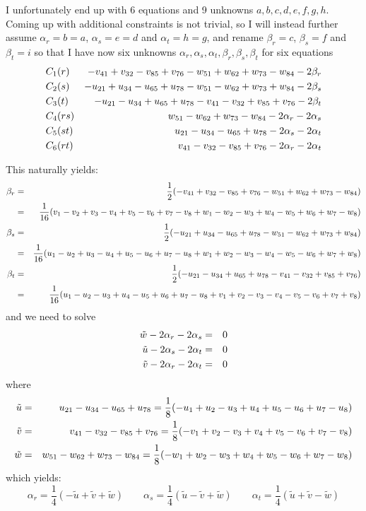 I unfortunately end up with 6 equations and 9 unknowns $a,b,c,d,e,f,g,h$.
Coming up with additional constraints is not trivial, so I will instead further assume 
$\alpha_r=b=a$, $\alpha_s=e=d$ and $\alpha_t=h=g$, and rename 
$\beta_r=c$, $\beta_s=f$ and $\beta_t=i$ so that
I have now six unknowns $\alpha_r,\alpha_s,\alpha_t,\beta_r,\beta_s,\beta_t$ for six equations
\begin{eqnarray}
C_1   &(r)  &  -v_{41} +v_{32} -v_{85} + v_{76} - w_{51} + w_{62} + w_{73} -w_{84} -2\beta_r \nonumber\\ 
C_2   &(s)  &  -u_{21} +u_{34} -u_{65} + u_{78} - w_{51} - w_{62} + w_{73} +w_{84} -2\beta_s \nonumber\\ 
C_3   &(t)  &  -u_{21} -u_{34} +u_{65} + u_{78} - v_{41} - v_{32} + v_{85} +v_{76} -2\beta_t \nonumber\\ 
C_4   &(rs) &  w_{51} -w_{62} +w_{73} - w_{84}  -2\alpha_r -2\alpha_s   \nonumber\\
C_5   &(st) &  u_{21} -u_{34} -u_{65} + u_{78}  -2\alpha_s -2\alpha_t   \nonumber\\
C_6   &(rt) &  v_{41} -v_{32} -v_{85} + v_{76}  -2\alpha_r -2\alpha_t   \nonumber
\end{eqnarray}


This naturally yields:
\begin{eqnarray}
\beta_r
&=& \frac{1}{2} ( -v_{41} +v_{32} -v_{85} + v_{76} - w_{51} + w_{62} + w_{73} -w_{84}  ) \nonumber\\
&=& \frac{1}{16} (v_1-v_2+v_3-v_4+v_5-v_6+v_7-v_8  +w_1-w_2 - w_3 + w_4 - w_5 + w_6 +w_7  - w_8    )  \nonumber\\
\beta_s&=& \frac{1}{2} ( -u_{21} +u_{34} -u_{65} + u_{78} - w_{51} - w_{62} + w_{73} +w_{84}  ) \nonumber\\
&=& \frac{1}{16} (u_1-u_2+u_3-u_4+u_5-u_6+u_7-u_8  +w_1 + w_2 - w_3 - w_4 - w_5 - w_6 +w_7 + w_8   )  \nonumber\\
\beta_t&=& \frac{1}{2} ( -u_{21} -u_{34} +u_{65} + u_{78} - v_{41} - v_{32} + v_{85} +v_{76}   ) \nonumber\\
&=& \frac{1}{16} ( u_1-u_2-u_3+u_4 -u_5 + u_6 + u_7 - u_8 +v_1 +v_2 - v_3 - v_4 - v_5 - v_6 + v_7 + v_8  )  \nonumber
\end{eqnarray}
and we need to solve
\begin{eqnarray}
\tilde{w} -2\alpha_r -2\alpha_s&=&0\nonumber\\
\tilde{u} -2\alpha_s -2\alpha_t&=&0\nonumber\\
\tilde{v} -2\alpha_r -2\alpha_t&=&0\nonumber
\end{eqnarray}
where
\begin{eqnarray}
\tilde{u} 
&=& u_{21} -u_{34} -u_{65} + u_{78} 
=\frac{1}{8}(-u_1 + u_2-u_3+u_4 + u_5-u_6 + u_7-u_8  )
\nonumber\\
\tilde{v} 
&=& v_{41} -v_{32} -v_{85} + v_{76}
= \frac{1}{8} (-v_1 + v_2 - v_3 + v_4 + v_5 - v_6 + v_7 - v_8    )
  \nonumber\\ 
\tilde{w} 
&=&  w_{51} -w_{62} +w_{73} - w_{84} 
=\frac{1}{8} (-w_1+w_2-w_3+w_4 + w_5 - w_6 + w_7 -w_8  )
\nonumber
\end{eqnarray}
which yields:
\[
\alpha_r=\frac{1}{4} ( -\tilde{u} + \tilde{v} + \tilde{w} ) 
\quad\quad
\alpha_s=\frac{1}{4} ( \tilde{u} - \tilde{v} + \tilde{w} ) 
\quad\quad
\alpha_t=\frac{1}{4} ( \tilde{u} + \tilde{v} - \tilde{w} ) 
\]

